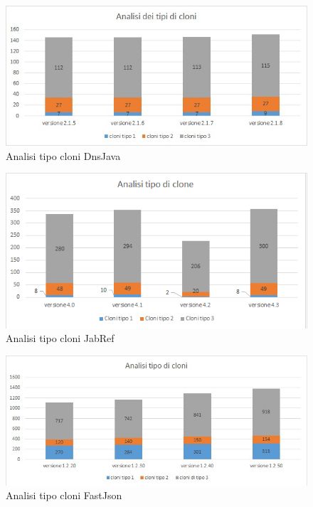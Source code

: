 \begin{figure}[h]
	\centering
	\includegraphics[scale=0.7, trim = 0cm 0cm 0cm 0cm, clip=true]{Grafici_dnsJava/TipiCloni.jpg}
	\caption{Analisi tipo cloni DnsJava}
	\label{fig:tipiCloniDnsJava}	
\end{figure}
\begin{figure}[h]
	\centering
	\includegraphics[scale=0.7, trim = 0cm 0cm 0cm 0cm, clip=true]{Grafici_jabRef/TipiCloni.png}
	\caption{Analisi tipo cloni JabRef}
	\label{fig:tipiCloniJabRef}
\end{figure}
\begin{figure}[h]
	\centering
	\includegraphics[scale=0.58, trim = 0cm 0cm 0cm 0cm, clip=true]{Grafici_fastJson/TipiCloni.jpg}
	\caption{Analisi tipo cloni FastJson}
	\label{fig:tipiCloniFastjson}
\end{figure}

